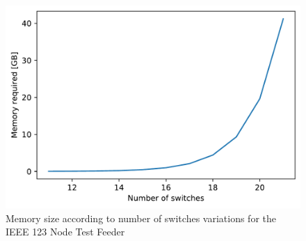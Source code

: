 \begin{figure}
    \centering
    \includegraphics[scale=0.5]{_conclusions/fig/switches.pdf}
    \caption{Memory size according to number of switches variations for the IEEE 123 Node Test Feeder}
    \label{ch-conclusions:fig:ms_switches}
\end{figure}